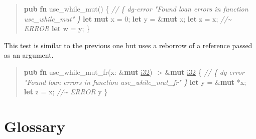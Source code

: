 \documentclass[
  11pt,
  twoside,symmetric]{report}
\newenvironment{Shaded}{}{}
\newcommand{\CommentTok}[1]{\textit{#1}}
\newcommand{\DataTypeTok}[1]{\underline{#1}}
\newcommand{\DecValTok}[1]{#1}
\newcommand{\KeywordTok}[1]{\textbf{#1}}
\newcommand{\NormalTok}[1]{#1}
\newcommand{\OperatorTok}[1]{#1}
\begin{document}
\begin{quote}
\begin{Shaded}
\begin{Highlighting}[]
\KeywordTok{pub} \KeywordTok{fn}\NormalTok{ use\_while\_mut() }\OperatorTok{\{}
    \CommentTok{// \{ dg{-}error "Found loan errors in function use\_while\_mut" \}}
    \KeywordTok{let} \KeywordTok{mut}\NormalTok{ x }\OperatorTok{=} \DecValTok{0}\OperatorTok{;}
    \KeywordTok{let}\NormalTok{ y }\OperatorTok{=} \OperatorTok{\&}\KeywordTok{mut}\NormalTok{ x}\OperatorTok{;}
    \KeywordTok{let}\NormalTok{ z }\OperatorTok{=}\NormalTok{ x}\OperatorTok{;} \CommentTok{//\textasciitilde{} ERROR}
    \KeywordTok{let}\NormalTok{ w }\OperatorTok{=}\NormalTok{ y}\OperatorTok{;}
\OperatorTok{\}}
\end{Highlighting}
\end{Shaded}
\end{quote}

This test is similar to the previous one but uses a reborrow of a
reference passed as an argument.

\begin{quote}
\begin{Shaded}
\begin{Highlighting}[]
\KeywordTok{pub} \KeywordTok{fn}\NormalTok{ use\_while\_mut\_fr(x}\OperatorTok{:} \OperatorTok{\&}\KeywordTok{mut} \DataTypeTok{i32}\NormalTok{) }\OperatorTok{{-}\textgreater{}} \OperatorTok{\&}\KeywordTok{mut} \DataTypeTok{i32} \OperatorTok{\{} 
    \CommentTok{// \{ dg{-}error "Found loan errors in function use\_while\_mut\_fr" \}}
    \KeywordTok{let}\NormalTok{ y }\OperatorTok{=} \OperatorTok{\&}\KeywordTok{mut} \OperatorTok{*}\NormalTok{x}\OperatorTok{;}
    \KeywordTok{let}\NormalTok{ z }\OperatorTok{=}\NormalTok{ x}\OperatorTok{;} \CommentTok{//\textasciitilde{} ERROR}
\NormalTok{    y}
\OperatorTok{\}}
\end{Highlighting}
\end{Shaded}
\end{quote}

\chapter{Glossary}\label{glossary}
\end{document}
